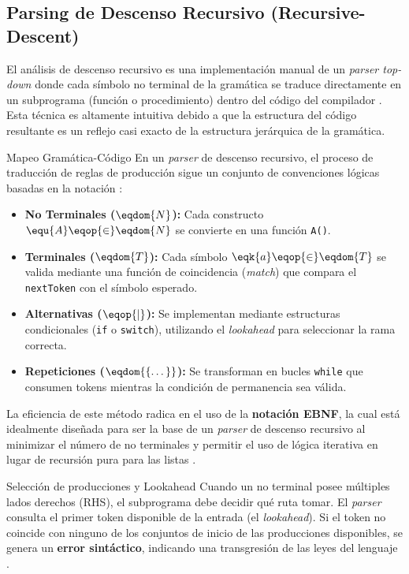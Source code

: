 \subsection{Parsing de Descenso Recursivo (Recursive-Descent)}
\label{subsec:3_5_2_recursive_descent}

El análisis de descenso recursivo es una implementación manual de un \textit{parser top-down} donde cada símbolo no terminal de la gramática se traduce directamente en un subprograma (función o procedimiento) dentro del código del compilador \cite{aho2006compilers}. Esta técnica es altamente intuitiva debido a que la estructura del código resultante es un reflejo casi exacto de la estructura jerárquica de la gramática.

\begin{definicion}{Mapeo Gramática-Código}
En un \textit{parser} de descenso recursivo, el proceso de traducción de reglas de producción sigue un conjunto de convenciones lógicas basadas en la notación  \cite{aho2006compilers}:
\begin{itemize}
    \item \textbf{No Terminales ($\eqdom{N}$):} Cada constructo $\equ{A} \eqop{\in} \eqdom{N}$ se convierte en una función \texttt{A()}.
    \item \textbf{Terminales ($\eqdom{T}$):} Cada símbolo $\eqk{a} \eqop{\in} \eqdom{T}$ se valida mediante una función de coincidencia (\textit{match}) que compara el \texttt{nextToken} con el símbolo esperado.
    \item \textbf{Alternativas ($\eqop{\mid}$):} Se implementan mediante estructuras condicionales (\texttt{if} o \texttt{switch}), utilizando el \textit{lookahead} para seleccionar la rama correcta.
    \item \textbf{Repeticiones ($\eqdom{\{\dots\}}$):} Se transforman en bucles \texttt{while} que consumen tokens mientras la condición de permanencia sea válida.
\end{itemize}
\end{definicion}

La eficiencia de este método radica en el uso de la \textbf{notación EBNF}, la cual está idealmente diseñada para ser la base de un \textit{parser} de descenso recursivo al minimizar el número de no terminales y permitir el uso de lógica iterativa en lugar de recursión pura para las listas \cite{aho2006compilers}.

\begin{observacion}{Selección de producciones y Lookahead}
Cuando un no terminal posee múltiples lados derechos (RHS), el subprograma debe decidir qué ruta tomar. El \textit{parser} consulta el primer token disponible de la entrada (el \textit{lookahead}). Si el token no coincide con ninguno de los conjuntos de inicio de las producciones disponibles, se genera un \textbf{error sintáctico}, indicando una transgresión de las leyes del lenguaje \cite{aho2006compilers}.
\end{observacion}

